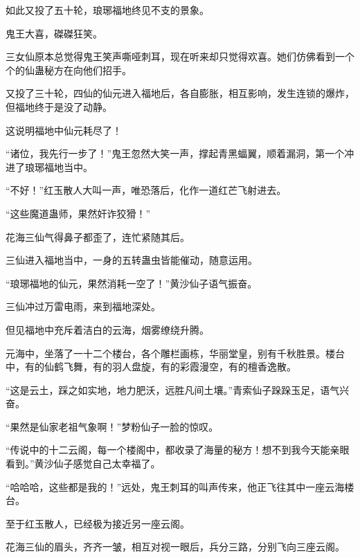 \begin{this_body}
如此又投了五十轮，琅琊福地终见不支的景象。

鬼王大喜，磔磔狂笑。

三女仙原本总觉得鬼王笑声嘶哑刺耳，现在听来却只觉得欢喜。她们仿佛看到一个个的仙蛊秘方在向他们招手。

又投了三十轮，四仙的仙元进入福地后，各自膨胀，相互影响，发生连锁的爆炸，但福地终于是没了动静。

这说明福地中仙元耗尽了！

“诸位，我先行一步了！”鬼王忽然大笑一声，撑起青黑蝠翼，顺着漏洞，第一个冲进了琅琊福地当中。

“不好！”红玉散人大叫一声，唯恐落后，化作一道红芒飞射进去。

“这些魔道蛊师，果然奸诈狡猾！”

花海三仙气得鼻子都歪了，连忙紧随其后。

三仙进入福地当中，一身的五转蛊虫皆能催动，随意运用。

“琅琊福地的仙元，果然消耗一空了！”黄沙仙子语气振奋。

三仙冲过万雷电雨，来到福地深处。

但见福地中充斥着洁白的云海，烟雾缭绕升腾。

元海中，坐落了一十二个楼台，各个雕栏画栋，华丽堂皇，别有千秋胜景。楼台中，有的仙鹤飞舞，有的羽人盘旋，有的彩霞漫空，有的檀香逸散。

“这是云土，踩之如实地，地力肥沃，远胜凡间土壤。”青索仙子跺跺玉足，语气兴奋。

“果然是仙家老祖气象啊！”梦粉仙子一脸的惊叹。

“传说中的十二云阁，每一个楼阁中，都收录了海量的秘方！想不到我今天能亲眼看到。”黄沙仙子感觉自己太幸福了。

“哈哈哈，这些都是我的！”远处，鬼王刺耳的叫声传来，他正飞往其中一座云海楼台。

至于红玉散人，已经极为接近另一座云阁。

花海三仙的眉头，齐齐一皱，相互对视一眼后，兵分三路，分别飞向三座云阁。

\end{this_body}

